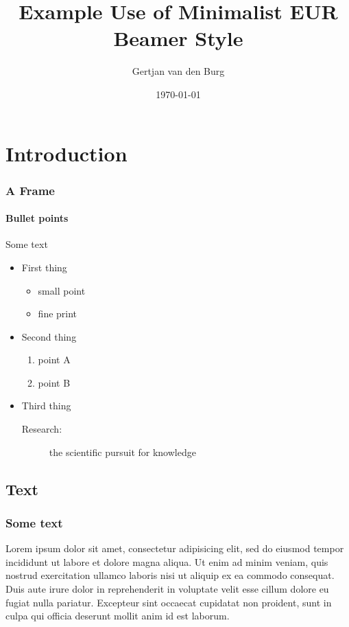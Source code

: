 \documentclass[]{beamer}
\title{Example Use of Minimalist EUR Beamer Style}
\author{Gertjan van den Burg}
\date{\today}
\institute{Econometric Institute}
\begin{document}
\begin{frame}[plain]
	\titlepage
\end{frame}


\section{Introduction}
\begin{frame}
	\frametitle{A Frame}
	\framesubtitle{Bullet points}
	Some text
	\begin{itemize}
		\item First thing
		\begin{itemize}
			\item small point
			\item fine print
		\end{itemize}
		\item Second thing
		\begin{enumerate}
			\item point A
			\item point B
		\end{enumerate}
		\item Third thing
		\begin{description}
			\item[Research:] the scientific pursuit for knowledge
		\end{description}
	\end{itemize}
\end{frame}

\subsection{Text}
\begin{frame}
	\frametitle{Some text}
	Lorem ipsum dolor sit amet, consectetur adipisicing elit, sed do 
	eiusmod tempor incididunt ut labore et dolore magna aliqua. Ut enim ad 
	minim veniam, quis nostrud exercitation ullamco laboris nisi ut aliquip 
	ex ea commodo consequat. Duis aute irure dolor in reprehenderit in 
	voluptate velit esse cillum dolore eu fugiat nulla pariatur. Excepteur 
	sint occaecat cupidatat non proident, sunt in culpa qui officia 
	deserunt mollit anim id est laborum.
\end{frame}
\end{document}
